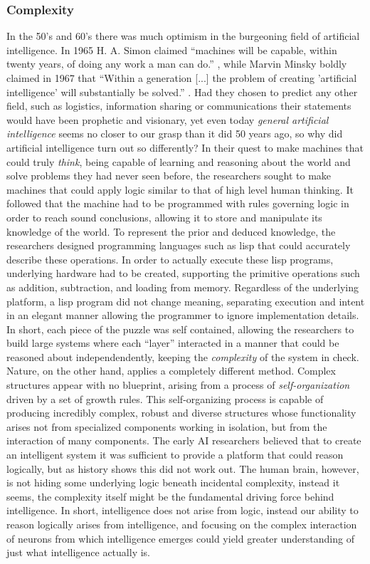 \subsubsection{Complexity}
In the 50's and 60's there was much optimism in the burgeoning field of
artificial intelligence. In 1965 H. A. Simon claimed ``machines will be capable,
within twenty years, of doing any work a man can
do.''\cite{DREYFUS92} , while Marvin Minsky boldly claimed in 1967
that ``Within a generation [...] the problem of creating 'artificial intelligence'
will substantially be solved.'' \cite{DREYFUS92}.
Had they chosen to predict any other field, such as logistics, information
sharing or communications their statements would have been prophetic and
visionary, yet even today \emph{general artificial intelligence} seems no closer
to our grasp than it did 50 years ago, so why did artificial intelligence turn
out so differently? 
%
In their quest to make machines that could truly \emph{think}, being capable of
learning and reasoning about the world and solve problems they had never seen
before, the researchers sought to make machines that could apply logic similar
to that of high level human thinking.
%
It followed that the machine had to be programmed with rules governing logic in
order to reach sound conclusions, allowing it to store and manipulate its
knowledge of the world.
%
To represent the prior and deduced knowledge, the researchers designed
programming languages such as lisp\cite{LISP_WEENIE} that could accurately
describe these operations.
%
In order to actually execute these lisp programs, underlying hardware had to be
created, supporting the primitive operations such as addition, subtraction, and
loading from memory.
%
Regardless of the underlying platform, a lisp program did not change meaning,
separating execution and intent in an elegant manner allowing the programmer to
ignore implementation details.
%
In short, each piece of the puzzle was self contained, allowing the researchers 
to build large systems where each ``layer'' interacted in a manner that could be
reasoned about independendently, keeping the \emph{complexity} of the system in
check.
%
Nature, on the other hand, applies a completely different method.
Complex structures appear with no blueprint, arising from a process of
\emph{self-organization} driven by a set of growth rules.
%
This self-organizing process is capable of producing incredibly complex, robust
and diverse structures whose functionality arises not from specialized
components working in isolation, but from the interaction of many components.
%
The early AI researchers believed that to create an intelligent system it was
sufficient to provide a platform that could reason logically, but as history
shows this did not work out.
%
The human brain, however, is not hiding some underlying logic beneath incidental
complexity, instead it seems, the complexity itself might be the fundamental
driving force behind intelligence.
%
In short, intelligence does not arise from logic, instead our ability to reason
logically arises from intelligence, and focusing on the complex interaction of
neurons from which intelligence emerges could yield greater understanding of
just what intelligence actually is.
